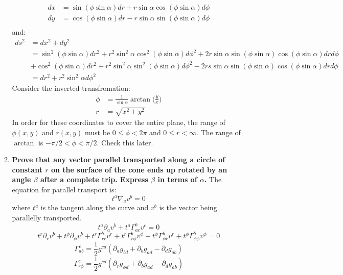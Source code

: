 \documentclass[9pt]{report}
\begin{document}
\begin{enumerate}
\begin{enumerate}
        \[
          \begin{align}
            dx &= \sin(\phi\sin\alpha) dr + r\sin\alpha\cos(\phi\sin\alpha) d\phi\\
            dy &= \cos(\phi\sin\alpha) dr - r\sin\alpha\sin(\phi\sin\alpha) d\phi\\
          \end{align}
        \]
        and:
        \[
          \begin{align}
            ds^2 &= dx^2 + dy^2\\
                 &=\sin^2(\phi\sin\alpha)dr^2 + r^2\sin^2\alpha \cos^2(\phi\sin\alpha)d\phi^2 + 2r\sin\alpha\sin(\phi\sin\alpha)\cos(\phi\sin\alpha) dr d\phi\\
                 &+ \cos^2(\phi\sin\alpha)dr^2 +r^2\sin^2\alpha \sin^2(\phi\sin\alpha)d\phi^2 - 2rs\sin\alpha\sin(\phi\sin\alpha)\cos(\phi\sin\alpha) dr d\phi\\
                 &= dr^2 + r^2\sin^2\alpha d\phi^2
          \end{align}
        \]
        Consider the inverted transfromation:
        \[
          \begin{align}
            \phi &= \frac{1}{\sin\alpha} \arctan\Big(\frac{y}{x}\Big) \\
            r &= \sqrt{x^2 + y^2}
          \end{align}
        \]
        In order for these coordinates to cover the entire plane, the range
        of $\phi(x,y)$ and $r(x, y)$ must be $0 \leq \phi < 2\pi$ and
        $0 \leq r < \infty$. The range of $\arctan$ is $-\pi/2 < \phi < \pi / 2$.
        Check this later.
      \item \textbf{Prove that any vector parallel transported along a
        circle of constant $r$ on the surface of the cone ends up rotated
        by an angle $\beta$ after a complete trip. Express $\beta$ in terms
        of $\alpha$.}
        The equation for parallel transport is:
        \[
          t^a \nabla_a v^b = 0
        \]
        where $t^a$ is the tangent along the curve and $v^b$ is the vector
        being parallelly transported.
        \[
          t^a \partial_a v^b + t^a \Gamma^b_{ac} v^c = 0
        \]
        \[
          t^r \partial_r v^b + t^\phi \partial_\phi v^b +
          t^r \Gamma^b_{rr} v^r +t^r \Gamma^b_{r\phi} v^\phi + t^\phi \Gamma^b_{\phi r} v^r + t^\phi \Gamma^b_{\phi\phi } v^\phi = 0
        \]
        \[
          \Gamma^c_{ab} = \frac{1}{2} g^{cd} (\partial_a g_{bd} + \partial_b g_{ad} - \partial_d g_{ab} )
        \]
        \[
          \Gamma^c_{r\phi} = \frac{1}{2} g^{cd} (\partial_r g_{\phi d} + \partial_b g_{ad} - \partial_d g_{ab} )
        \]
    \end{enumerate}
\end{enumerate}
\end{document}
